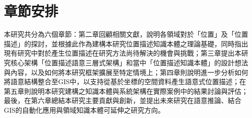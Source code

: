 \section{章節安排}

本研究共分為六個章節：第二章回顧相關文獻，說明各領域對於「位置」及「位置描述」的探討，並根據此作為建構本研究位置描述知識本體之理論基礎，同時指出現有研究中對於產生位置描述在研究方法尚待解決的機會與挑戰；第三章提出本研究核心架構「位置描述語意三層式架構」和當中「位置描述知識本體」的設計想法與內容，以及如何將本研究框架擴展至特定情境上；第四章則說明進一步分析如何將語意結構整合至GIS中，以支持從基於坐標的空間資料產生語意式位置描述；在第五章則說明本研究建構之知識本體與系統架構在實際案例中的結果討論與評估；最後，在第六章總結本研究主要貢獻與創新，並提出未來研究在語意推論、結合GIS的自動化應用與領域知識本體可延伸之研究方向。